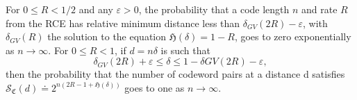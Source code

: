 \begin{theorem}
For $0\leq R< 1/2$ and any $\varepsilon>0$, the probability that a code length $n$ and rate $R$ from the RCE has relative minimum distance less than $\delta_{GV}(2R)-\varepsilon$, with $\delta_{GV}(R) $ the solution to the equation $\mathfrak{H}(\delta) = 1-R$, goes to zero exponentially as $n\to \infty$. For $0\leq R < 1$, if $d=n\delta$ is such that
\begin{equation}
\delta_{GV}(2R)+\varepsilon \leq \delta \leq 1- \delta{GV}(2R) - \varepsilon,
\end{equation}
then the probability that the number of codeword pairs at a distance d satisfies $\mathcal{S}_{\mathfrak{C}}(d) \doteq 2^{n(2 R-1+\mathfrak{H}(\delta))}$ goes to one as $n\to \infty$.
\end{theorem}

